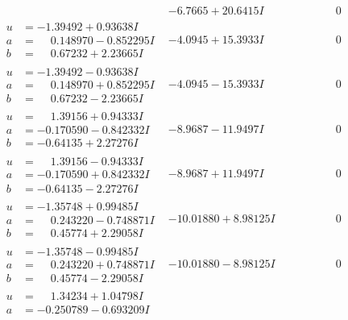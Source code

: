\documentclass[1p]{elsarticle_modified}
\theoremstyle{definition}
\begin{document}
$$\begin{array}{c|c|c}
 & -6.7665 + 20.6415 I & \phantom{-0.000000 } 0 \\ \hline\begin{aligned}
u &= -1.39492 + 0.93638 I \\
a &= \phantom{-}0.148970 - 0.852295 I \\
b &= \phantom{-}0.67232 + 2.23665 I\end{aligned}
 & -4.0945 + 15.3933 I & \phantom{-0.000000 } 0 \\ \hline\begin{aligned}
u &= -1.39492 - 0.93638 I \\
a &= \phantom{-}0.148970 + 0.852295 I \\
b &= \phantom{-}0.67232 - 2.23665 I\end{aligned}
 & -4.0945 - 15.3933 I & \phantom{-0.000000 } 0 \\ \hline\begin{aligned}
u &= \phantom{-}1.39156 + 0.94333 I \\
a &= -0.170590 - 0.842332 I \\
b &= -0.64135 + 2.27276 I\end{aligned}
 & -8.9687 - 11.9497 I & \phantom{-0.000000 } 0 \\ \hline\begin{aligned}
u &= \phantom{-}1.39156 - 0.94333 I \\
a &= -0.170590 + 0.842332 I \\
b &= -0.64135 - 2.27276 I\end{aligned}
 & -8.9687 + 11.9497 I & \phantom{-0.000000 } 0 \\ \hline\begin{aligned}
u &= -1.35748 + 0.99485 I \\
a &= \phantom{-}0.243220 - 0.748871 I \\
b &= \phantom{-}0.45774 + 2.29058 I\end{aligned}
 & -10.01880 + 8.98125 I & \phantom{-0.000000 } 0 \\ \hline\begin{aligned}
u &= -1.35748 - 0.99485 I \\
a &= \phantom{-}0.243220 + 0.748871 I \\
b &= \phantom{-}0.45774 - 2.29058 I\end{aligned}
 & -10.01880 - 8.98125 I & \phantom{-0.000000 } 0 \\ \hline\begin{aligned}
u &= \phantom{-}1.34234 + 1.04798 I \\
a &= -0.250789 - 0.693209 I \\

\end{aligned}
\end{array}$$
\end{document}
